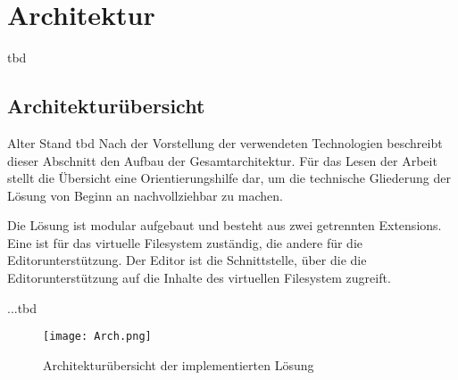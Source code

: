 \section{Architektur}
tbd

\subsection{Architekturübersicht}
Alter Stand tbd
Nach der Vorstellung der verwendeten Technologien beschreibt dieser Abschnitt den Aufbau der Gesamtarchitektur. Für das Lesen der Arbeit stellt die Übersicht eine Orientierungshilfe dar, um die technische Gliederung der Lösung von Beginn an nachvollziehbar zu machen.

Die Lösung ist modular aufgebaut und besteht aus zwei getrennten Extensions. Eine ist für das virtuelle Filesystem zuständig, die andere für die Editorunterstützung. Der Editor ist die Schnittstelle, über die die Editorunterstützung auf die Inhalte des virtuellen Filesystem zugreift.

...tbd


\begin{figure}[H]
  \centering
  \texttt{[image: Arch.png]}
  \caption{Architekturübersicht der implementierten Lösung}
  \label{fig:arch_modell}
\end{figure}
